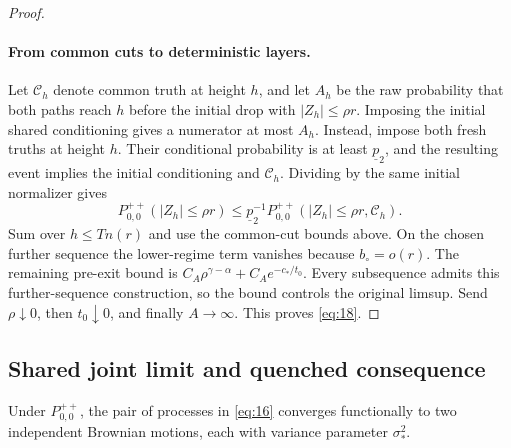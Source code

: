 \begin{proof}
\paragraph{From common cuts to deterministic layers.}
Let \(\mathcal C_h\) denote common truth at height \(h\), and let
\(A_h\) be the raw probability that both paths reach \(h\) before
the initial drop with \(|Z_h|\le\rho r\). Imposing the initial
shared conditioning gives a numerator at most \(A_h\). Instead,
impose both fresh truths at height \(h\). Their conditional probability
is at least \(\underline p_2\), and the resulting event implies the
initial conditioning and \(\mathcal C_h\). Dividing by the same
initial normalizer gives
\[
P_{0,0}^{++}(|Z_h|\le\rho r)
\le\underline p_2^{-1}
P_{0,0}^{++}(|Z_h|\le\rho r,\mathcal C_h).
\]
Sum over \(h\le Tn(r)\) and use the common-cut bounds above. On the
chosen further sequence the lower-regime term vanishes because
\(b_\circ=o(r)\). The remaining pre-exit bound is
\(C_A\rho^{\gamma-\alpha}+C_Ae^{-c_*/t_0}\). Every subsequence
admits this further-sequence construction, so the bound controls the
original limsup. Send \(\rho\downarrow0\), then \(t_0\downarrow0\),
and finally \(A\to\infty\). This proves \eqref{eq:18}.
\end{proof}

\subsection{Shared joint limit and quenched consequence}

\begin{proposition}\label{gauss-joint}
Under \(P_{0,0}^{++}\), the pair of processes in \eqref{eq:16}
converges functionally to two independent Brownian motions, each with
variance parameter \(\sigma_*^2\).
\end{proposition}

